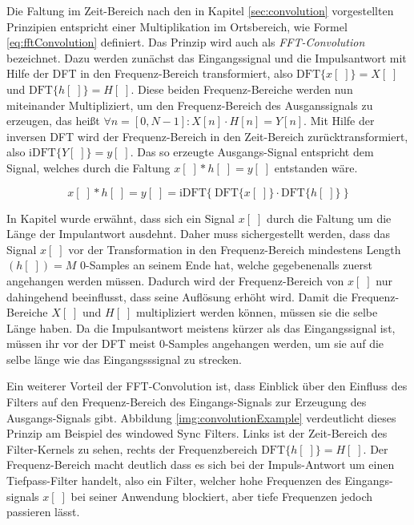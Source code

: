 Die Faltung im Zeit-Bereich nach den in Kapitel \ref{sec:convolution} vorgestellten Prinzipien entspricht einer Multiplikation im Ortsbereich, wie Formel \ref{eq:fftConvolution} definiert. Das Prinzip wird auch als \emph{FFT-Convolution} bezeichnet. Dazu werden zunächst das Eingangssignal und die Impulsantwort mit Hilfe der DFT in den Frequenz-Bereich transformiert, also $\text{DFT}\{x[\;]\} = X[\;]$ und $\text{DFT}\{h[\;]\} = H[\;]$. Diese beiden Frequenz-Bereiche werden nun miteinander Multipliziert, um den Frequenz-Bereich des Ausganssignals zu erzeugen, das heißt $\forall n = [0,N-1]: X[n] \cdot H[n] = Y[n]$. Mit Hilfe der inversen DFT wird der Frequenz-Bereich in den Zeit-Bereich zurücktransformiert, also $\text{iDFT}\{ Y[\;] \} = y[\;]$. Das so erzeugte Ausgangs-Signal entspricht dem Signal, welches durch die Faltung $x[\;] * h[\;] = y[\;]$ entstanden wäre.\cite[S. 182]{dspGuide}

\begin{equation}
x[\;] * h[\;] = y[\;] = \text{iDFT}\Big\{\ \text{DFT}\{x[\;]\} \cdot \text{DFT}\{h[\;]\}\ \Big\}
\label{eq:fftConvolution}
\end{equation}

In Kapitel \label{sec:convolution} wurde erwähnt, dass sich ein Signal $x[\;]$ durch die Faltung um die Länge der Impulantwort ausdehnt. Daher muss sichergestellt werden, dass das Signal $x[\;]$ vor der Transformation in den Frequenz-Bereich mindestens Length$(h[\;]) = M$ 0-Samples an seinem Ende hat, welche gegebenenalls zuerst angehangen werden müssen. Dadurch wird der Frequenz-Bereich von $x[\;]$ nur dahingehend beeinflusst, dass seine Auflösung erhöht wird. Damit die Frequenz-Bereiche $ X[\;]$ und $H[\;]$ multipliziert werden können, müssen sie die selbe Länge haben. Da die Impulsantwort meistens kürzer als das Eingangssignal ist, müssen ihr vor der DFT meist 0-Samples angehangen werden, um sie auf die selbe länge wie das Eingangsssignal \glqq zu strecken\grqq{}.\cite[S. 183 -184]{dspGuide}

Ein weiterer Vorteil der FFT-Convolution ist, dass Einblick über den Einfluss des Filters auf den Frequenz-Bereich des Eingangs-Signals zur Erzeugung des Ausgangs-Signals gibt. Abbildung \ref{img:convolutionExample} verdeutlicht dieses Prinzip am Beispiel des \glqq windowed Sync Filters\grqq.  Links ist der Zeit-Bereich des Filter-Kernels zu sehen, rechts der Frequenzbereich $\text{DFT}\{h[\;]\} = H[\;]$. Der Frequenz-Bereich macht deutlich dass es sich bei der Impuls-Antwort um einen Tiefpass-Filter handelt, also ein Filter, welcher hohe Frequenzen des Eingangs-signals $x[\;]$ bei seiner Anwendung blockiert, aber tiefe Frequenzen jedoch passieren lässt.\cite[S. 180]{dspGuide}

